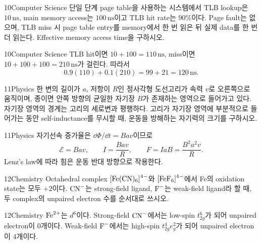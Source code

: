 \documentclass[12pt,aspectratio=169]{beamer}
\begin{document}
\begin{problemframe}{10}{Computer Science}
단일 단계 page table을 사용하는 시스템에서 TLB lookup은 $10\,\mathrm{ns}$, main memory access는 $100\,\mathrm{ns}$이고 TLB hit rate는 $90\%$이다. Page fault는 없으며, TLB miss 시 page table entry를 memory에서 한 번 읽은 뒤 실제 data를 한 번 더 읽는다. Effective memory access time을 구하시오.
\end{problemframe}

\begin{solutionframe}{10}{Computer Science}
TLB hit이면 $10+100=110\,\mathrm{ns}$, miss이면 $10+100+100=210\,\mathrm{ns}$가 걸린다. 따라서
\[
0.9(110)+0.1(210)=99+21=120\,\mathrm{ns}.
\]
\end{solutionframe}

\begin{problemframe}{11}{Physics}
한 변의 길이가 $a$, 저항이 $R$인 정사각형 도선고리가 속력 $v$로 오른쪽으로 움직이며, 종이면 안쪽 방향의 균일한 자기장 $B$가 존재하는 영역으로 들어가고 있다. 자기장 영역의 경계는 고리의 세로변과 평행하다. 고리가 자기장 영역에 부분적으로 들어가는 동안 self-inductance를 무시할 때, 운동을 방해하는 자기력의 크기를 구하시오.
\end{problemframe}

\begin{solutionframe}{11}{Physics}
자기선속 증가율은 $\dd\Phi/\dd t=Bav$이므로
\[
\mathcal E=Bav,
\qquad
I=\frac{Bav}{R},
\qquad
F=IaB=\frac{B^2a^2v}{R}.
\]
Lenz's law에 따라 힘은 운동 반대 방향으로 작용한다.
\end{solutionframe}

\begin{problemframe}{12}{Chemistry}
Octahedral complex $\ce{[Fe(CN)6]^4-}$와 $\ce{[FeF6]^4-}$에서 Fe의 oxidation state는 모두 $+2$이다. $\ce{CN^-}$는 strong-field ligand, $\ce{F^-}$는 weak-field ligand라 할 때, 두 complex의 unpaired electron 수를 순서대로 쓰시오.
\end{problemframe}

\begin{solutionframe}{12}{Chemistry}
$\ce{Fe^{2+}}$는 $d^6$이다. Strong-field $\ce{CN^-}$에서는 low-spin $t_{2g}^6$가 되어 unpaired electron이 $0$개이다. Weak-field $\ce{F^-}$에서는 high-spin $t_{2g}^4e_g^2$가 되어 unpaired electron이 $4$개이다.
\end{solutionframe}
\end{document}

